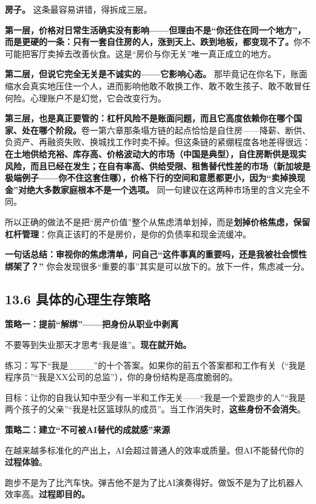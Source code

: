 \documentclass[11pt,a4paper]{ctexart}
\begin{document}
\textbf{房子。} 这条最容易讲错，得拆成三层。

\textbf{第一层，价格对日常生活确实没有影响——但理由不是“你还住在同一个地方”，而是更硬的一条：只有一套自住房的人，涨到天上、跌到地板，都变现不了。}你不可能把客厅卖掉去改善伙食。这是“房价与你无关”唯一真正成立的地方。

\textbf{第二层，但说它完全无关是不诚实的——它影响心态。} 那毕竟记在你名下，账面缩水会真实地压住一个人，进而影响他敢不敢换工作、敢不敢生孩子、敢不敢冒任何险。心理账户不是幻觉，它会改变行为。

\textbf{第三层，也是真正要管的：杠杆风险不是账面问题，而且它高度依赖你在哪个国家、处在哪个阶段。}卷一第六章那条塌方链的起点恰恰是自住房——降薪、断供、负资产、再融资失败、换城找工作时卖不掉。但这条链的紧绷程度各地差得很远：\textbf{在土地供给充裕、库存高、价格波动大的市场（中国是典型），自住房断供是现实风险，而且已经在发生；在自有率高、供给受限、租售替代性差的市场（新加坡是极端例子——你不住这套住哪），价格下行的空间和意愿都更小，因为“卖掉换现金”对绝大多数家庭根本不是一个选项。} 同一句建议在这两种市场里的含义完全不同。

所以正确的做法不是把“房产价值”整个从焦虑清单划掉，而是\textbf{划掉价格焦虑，保留杠杆管理}：你真正该盯的不是房价，是你的负债率和现金流缓冲。

\textbf{一句话总结：审视你的焦虑清单，问自己“这件事真的重要吗，还是我被社会惯性绑架了？”} 你会发现很多“重要的事”其实是可以放下的。放下一件，焦虑减一分。

\subsection{13.6 具体的心理生存策略}

\textbf{策略一：提前“解绑”——把身份从职业中剥离}

不要等到失业那天才思考“我是谁”。\textbf{现在就开始。}

练习：写下“我是\_\_\_\_”的十个答案。如果你的前五个答案都和工作有关（“我是程序员”“我是XX公司的总监”），你的身份结构是高度脆弱的。

目标：让你的自我认知中至少有一半和工作无关——“我是一个爱跑步的人”“我是两个孩子的父亲”“我是社区篮球队的成员”。当工作消失时，\textbf{这些身份不会消失}。

\textbf{策略二：建立“不可被AI替代的成就感”来源}

在越来越多标准化的产出上，AI会超过普通人的效率或质量。但AI不能替代你的\textbf{过程体验}。

跑步不是为了比汽车快。弹吉他不是为了比AI演奏得好。做饭不是为了比机器人效率高。\textbf{过程即目的。}
\end{document}
